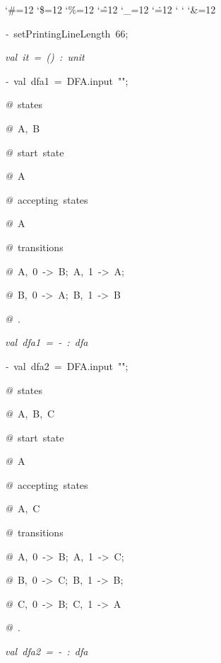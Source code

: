 \begin{list}{}
{\setlength{\leftmargin}{\leftmargini}
\setlength{\rightmargin}{0cm}
\setlength{\itemindent}{0cm}
\setlength{\listparindent}{0cm}
\setlength{\itemsep}{0cm}
\setlength{\parsep}{0cm}
\setlength{\labelsep}{0cm}
\setlength{\labelwidth}{0cm}
\catcode`\#=12
\catcode`\$=12
\catcode`\%=12
\catcode`\^=12
\catcode`\_=12
\catcode`\.=12
\catcode`
\catcode`
\catcode`\&=12
\ttfamily}
\small
\item[]\textsl{-\ }setPrintingLineLength\ 66;
\item[]\textsl{val\ it\ =\ ()\ :\ unit}
\item[]\textsl{-\ }val\ dfa1\ =\ DFA.input\ "";
\item[]\textsl{@\ }states
\item[]\textsl{@\ }A,\ B
\item[]\textsl{@\ }start\ state
\item[]\textsl{@\ }A
\item[]\textsl{@\ }accepting\ states
\item[]\textsl{@\ }A
\item[]\textsl{@\ }transitions
\item[]\textsl{@\ }A,\ 0\ ->\ B;\ A,\ 1\ ->\ A;
\item[]\textsl{@\ }B,\ 0\ ->\ A;\ B,\ 1\ ->\ B
\item[]\textsl{@\ }.
\item[]\textsl{val\ dfa1\ =\ -\ :\ dfa}
\item[]\textsl{-\ }val\ dfa2\ =\ DFA.input\ "";
\item[]\textsl{@\ }states
\item[]\textsl{@\ }A,\ B,\ C
\item[]\textsl{@\ }start\ state
\item[]\textsl{@\ }A
\item[]\textsl{@\ }accepting\ states
\item[]\textsl{@\ }A,\ C
\item[]\textsl{@\ }transitions
\item[]\textsl{@\ }A,\ 0\ ->\ B;\ A,\ 1\ ->\ C;
\item[]\textsl{@\ }B,\ 0\ ->\ C;\ B,\ 1\ ->\ B;
\item[]\textsl{@\ }C,\ 0\ ->\ B;\ C,\ 1\ ->\ A
\item[]\textsl{@\ }.
\item[]\textsl{val\ dfa2\ =\ -\ :\ dfa}
\end{list}
